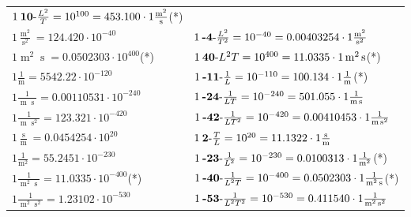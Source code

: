 \begin{center}
\begin{longtable}{l l}
	{\color{black}$1\:\text{\textbf{10}-} \frac{L^2}{T}=10^{100} = 453.100 \cdot 1 \bm{\mathrm{ }}\frac{\operatorname{m}^2}{\operatorname{s}}$}\quad(*)\\
{\color{black}$1 \bm{\mathrm{ }}\frac{\operatorname{m}^2}{\operatorname{s}^2} = 124.420\cdot10^{-40} $}&
	{\color{black}$1\:\text{\textbf{-4}-} \frac{L^2}{T^2}=10^{-40} = 0.00403254 \cdot 1 \bm{\mathrm{ }}\frac{\operatorname{m}^2}{\operatorname{s}^2}$}\\
{\color{black}$1 \bm{\mathrm{ }}\operatorname{m}^2\operatorname{s} = 0.0502303\cdot10^{400} $}\quad(*)&
	{\color{black}$1\:\text{\textbf{40}-} L^2T=10^{400} = 11.0335 \cdot 1 \bm{\mathrm{ }}\operatorname{m}^2\operatorname{s}$}\quad(*)\\
{\color{black}$1 \bm{\mathrm{ }}\frac1{\operatorname{m}} = 5542.22\cdot10^{-120} $}&
	{\color{black}$1\:\text{\textbf{-11}-} \frac1{L}=10^{-110} = 100.134 \cdot 1 \bm{\mathrm{ }}\frac1{\operatorname{m}}$}\quad(*)\\
{\color{black}$1 \bm{\mathrm{ }}\frac1{\operatorname{m}\operatorname{s}} = 0.00110531\cdot10^{-240} $}&
	{\color{black}$1\:\text{\textbf{-24}-} \frac1{LT}=10^{-240} = 501.055 \cdot 1 \bm{\mathrm{ }}\frac1{\operatorname{m}\operatorname{s}}$}\\
{\color{black}$1 \bm{\mathrm{ }}\frac1{\operatorname{m}\operatorname{s}^2} = 123.321\cdot10^{-420} $}&
	{\color{black}$1\:\text{\textbf{-42}-} \frac1{LT^2}=10^{-420} = 0.00410453 \cdot 1 \bm{\mathrm{ }}\frac1{\operatorname{m}\operatorname{s}^2}$}\\
{\color{black}$1 \bm{\mathrm{ }}\frac{\operatorname{s}}{\operatorname{m}} = 0.0454254\cdot10^{20} $}&
	{\color{black}$1\:\text{\textbf{2}-} \frac{T}{L}=10^{20} = 11.1322 \cdot 1 \bm{\mathrm{ }}\frac{\operatorname{s}}{\operatorname{m}}$}\\
{\color{black}$1 \bm{\mathrm{ }}\frac1{\operatorname{m}^2} = 55.2451\cdot10^{-230} $}&
	{\color{black}$1\:\text{\textbf{-23}-} \frac1{L^2}=10^{-230} = 0.0100313 \cdot 1 \bm{\mathrm{ }}\frac1{\operatorname{m}^2}$}\quad(*)\\
{\color{black}$1 \bm{\mathrm{ }}\frac1{\operatorname{m}^2\operatorname{s}} = 11.0335\cdot10^{-400} $}\quad(*)&
	{\color{black}$1\:\text{\textbf{-40}-} \frac1{L^2T}=10^{-400} = 0.0502303 \cdot 1 \bm{\mathrm{ }}\frac1{\operatorname{m}^2\operatorname{s}}$}\quad(*)\\
{\color{black}$1 \bm{\mathrm{ }}\frac1{\operatorname{m}^2\operatorname{s}^2} = 1.23102\cdot10^{-530} $}&
	{\color{black}$1\:\text{\textbf{-53}-} \frac1{L^2T^2}=10^{-530} = 0.411540 \cdot 1 \bm{\mathrm{ }}\frac1{\operatorname{m}^2\operatorname{s}^2}$}\\

\end{longtable}
\end{center}
